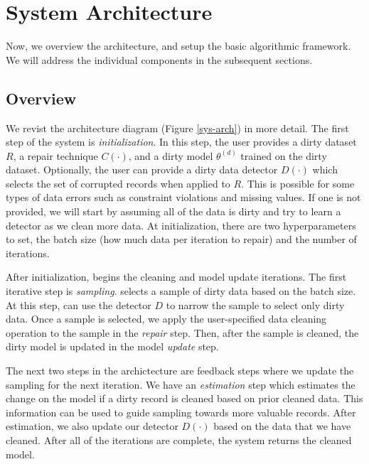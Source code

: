 \section{System Architecture}\label{arch}
Now, we overview the \sys architecture, and setup the basic algorithmic framework.
We will address the individual components in the subsequent sections.

\subsection{Overview}
We revist the architecture diagram (Figure \ref{sys-arch}) in more detail.
The first step of the system is \emph{initialization}.
In this step, the user provides a dirty dataset $R$, a repair technique $C(\cdot)$, and a dirty model $\theta^{(d)}$ trained on the dirty dataset. 
Optionally, the user can provide a dirty data detector $D(\cdot)$ which selects the set of corrupted records when applied to $R$.
This is possible for some types of data errors such as constraint violations and missing values.
If one is not provided, we will start by assuming all of the data is dirty and try to learn a detector as we clean more data.
At initialization, there are two hyperparameters to set, the batch size (how much data per iteration to repair) and the number of iterations.

After initialization, \sys begins the cleaning and model update iterations.
The first iterative step is \emph{sampling}.
\sys selects a sample of dirty data based on the batch size.
At this step, \sys can use the detector $D$ to narrow the sample to select only dirty data.
Once a sample is selected, we apply the user-specified data cleaning operation to the sample in the \emph{repair} step.
Then, after the sample is cleaned, the dirty model is updated in the model \emph{update} step.

The next two steps in the archictecture are feedback steps where we update the sampling for the next iteration.
We have an \emph{estimation} step which estimates the change on the model if a dirty record is cleaned based on prior cleaned data.
This information can be used to guide sampling towards more valuable records.
After estimation, we also update our detector $D(\cdot)$ based on the data that we have cleaned.
After all of the iterations are complete, the system returns the cleaned model.

